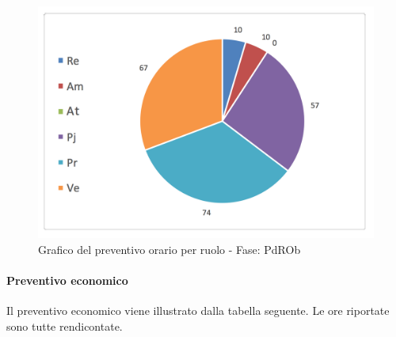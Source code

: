 			\begin{figure}[H]
			\centering
			\includegraphics[scale=0.32]{img/h_r_PdROb}
			\caption{Grafico del preventivo orario per ruolo - Fase: PdROb}
			\label{fig:h_r_PdROb"}
			\end{figure}

			\newpage
			\paragraph{Preventivo economico}
			Il preventivo economico viene illustrato dalla tabella seguente. Le ore riportate sono tutte rendicontate.\\


